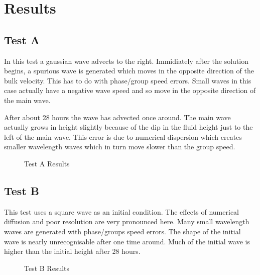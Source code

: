 \documentclass[11pt,twoside]{article}
\begin{document}
\section{Results}
\subsection{Test A}
In this test a gaussian wave advects to the right.  Immidiately after the solution begins, a spurious wave is generated which moves in the opposite direction of the bulk velocity. This has to do with phase/group speed errors. Small waves in this case actually have a negative wave speed and so move in the opposite direction of the main wave. 

After about 28 hours the wave has advected once around.  The main wave actually grows in height slightly because of the dip in the fluid height just to the left of the main wave. This error is due to numerical dispersion which creates smaller wavelength waves which in turn move slower than the group speed. 

\begin{figure}[!h]
\centering
{}
\caption{Test A Results}
\end{figure}

\clearpage
\subsection{Test B}

This test uses a square wave as an initial condition. The effects of numerical diffusion and poor resolution are very pronounced here. Many small wavelength waves are generated with phase/groups speed errors. The shape of the initial wave is nearly unrecognisable after one time around. Much of the initial wave is higher than the initial height after 28 hours. 

\begin{figure}[!h]
\centering
{}
\caption{Test B Results}
\end{figure}
\end{document}
